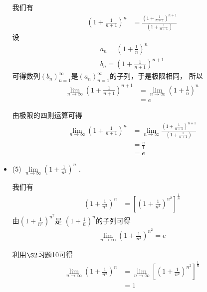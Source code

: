 \documentclass{article}
\begin{document}
\begin{itemize}
        我们有
        \begin{align*}
          \left(1 + \frac{1}{n + 1}\right)^n
           & = \frac{\left(1 + \frac{1}{n + 1}\right)^{n + 1}}{\left(1 + \frac{1}{n + 1}\right)}
        \end{align*}
        设
        \begin{align*}
          a_n = \left(1 + \frac{1}{n}\right)^n \\
          b_n = \left(1 + \frac{1}{n + 1}\right)^{n + 1}
        \end{align*}
        可得数列$(b_n)_{n = 1}^{\infty}$是$(a_n)_{n = 1}^{\infty}$的子列，于是极限相同，
        所以
        \begin{align*}
          \lim_{n \to \infty} \left(1 + \frac{1}{n + 1}\right)^{n + 1}
           & = \lim_{n \to \infty} \left(1 + \frac{1}{n}\right)^n \\
           & = e
        \end{align*}

        由极限的四则运算可得
        \begin{align*}
          \lim\limits_{n \to \infty} \left(1 + \frac{1}{n + 1}\right)^n
           & = \lim\limits_{n \to \infty} \frac{\left(1 + \frac{1}{n + 1}\right)^{n + 1}}{\left(1 + \frac{1}{n + 1}\right)} \\
           & = \frac{e}{1}                                                                                                  \\
           & = e
        \end{align*}

  \item (5) $\lim\limits_{n \to \infty} \left(1 + \frac{1}{n^2}\right)^n$ .

        我们有
        \begin{align*}
          \left(1 + \frac{1}{n^2}\right)^n
           & = \left[\left(1 + \frac{1}{n^2}\right)^{n^2}\right]^\frac{1}{n}
        \end{align*}
        由$\left(1 + \frac{1}{n^2}\right)^{n^2}$是
        $\left(1 + \frac{1}{n}\right)^{n}$的子列可得
        \begin{align*}
          \lim\limits_{n \to \infty} \left(1 + \frac{1}{n^2}\right)^{n^2} = e
        \end{align*}

        利用$\S 2$习题10可得
        \begin{align*}
          \lim\limits_{n \to \infty} \left(1 + \frac{1}{n^2}\right)^n
           & = \lim\limits_{n \to \infty} \left[\left(1 + \frac{1}{n^2}\right)^{n^2}\right]^\frac{1}{n} \\
           & = 1
        \end{align*}

\end{itemize}
\end{document}
